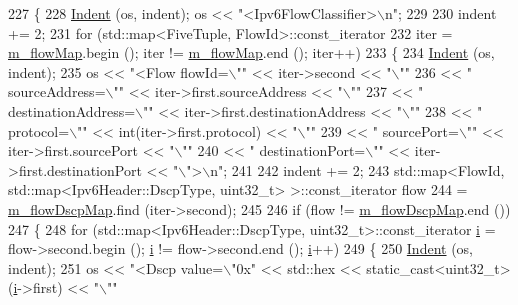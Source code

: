 \begin{DoxyCode}
227 \{
228   \hyperlink{classns3_1_1FlowClassifier_adc5d8694d3c9059b5ac2c664e5897088}{Indent} (os, indent); os << \textcolor{stringliteral}{"<Ipv6FlowClassifier>\(\backslash\)n"};
229 
230   indent += 2;
231   \textcolor{keywordflow}{for} (std::map<FiveTuple, FlowId>::const\_iterator
232        iter = \hyperlink{classns3_1_1Ipv6FlowClassifier_a2ba466f42f102ab81aed0d5cffde57a1}{m\_flowMap}.begin (); iter != \hyperlink{classns3_1_1Ipv6FlowClassifier_a2ba466f42f102ab81aed0d5cffde57a1}{m\_flowMap}.end (); iter++)
233     \{
234       \hyperlink{classns3_1_1FlowClassifier_adc5d8694d3c9059b5ac2c664e5897088}{Indent} (os, indent);
235       os << \textcolor{stringliteral}{"<Flow flowId=\(\backslash\)""} << iter->second << \textcolor{stringliteral}{"\(\backslash\)""}
236          << \textcolor{stringliteral}{" sourceAddress=\(\backslash\)""} << iter->first.sourceAddress << \textcolor{stringliteral}{"\(\backslash\)""}
237          << \textcolor{stringliteral}{" destinationAddress=\(\backslash\)""} << iter->first.destinationAddress << \textcolor{stringliteral}{"\(\backslash\)""}
238          << \textcolor{stringliteral}{" protocol=\(\backslash\)""} << int(iter->first.protocol) << \textcolor{stringliteral}{"\(\backslash\)""}
239          << \textcolor{stringliteral}{" sourcePort=\(\backslash\)""} << iter->first.sourcePort << \textcolor{stringliteral}{"\(\backslash\)""}
240          << \textcolor{stringliteral}{" destinationPort=\(\backslash\)""} << iter->first.destinationPort << \textcolor{stringliteral}{"\(\backslash\)">\(\backslash\)n"};
241 
242       indent += 2;
243       std::map<FlowId, std::map<Ipv6Header::DscpType, uint32\_t> >::const\_iterator flow
244         = \hyperlink{classns3_1_1Ipv6FlowClassifier_ae351d1b8e71e5253d34cfb3e7ee3ec2a}{m\_flowDscpMap}.find (iter->second);
245 
246       \textcolor{keywordflow}{if} (flow != \hyperlink{classns3_1_1Ipv6FlowClassifier_ae351d1b8e71e5253d34cfb3e7ee3ec2a}{m\_flowDscpMap}.end ())
247         \{
248           \textcolor{keywordflow}{for} (std::map<Ipv6Header::DscpType, uint32\_t>::const\_iterator \hyperlink{bernuolliDistribution_8m_a6f6ccfcf58b31cb6412107d9d5281426}{i} = flow->second.begin (); 
      \hyperlink{bernuolliDistribution_8m_a6f6ccfcf58b31cb6412107d9d5281426}{i} != flow->second.end (); \hyperlink{bernuolliDistribution_8m_a6f6ccfcf58b31cb6412107d9d5281426}{i}++)
249             \{
250               \hyperlink{classns3_1_1FlowClassifier_adc5d8694d3c9059b5ac2c664e5897088}{Indent} (os, indent);
251               os << \textcolor{stringliteral}{"<Dscp value=\(\backslash\)"0x"} << std::hex << static\_cast<uint32\_t> (\hyperlink{bernuolliDistribution_8m_a6f6ccfcf58b31cb6412107d9d5281426}{i}->first) << \textcolor{stringliteral}{"\(\backslash\)""}

\end{DoxyCode}
